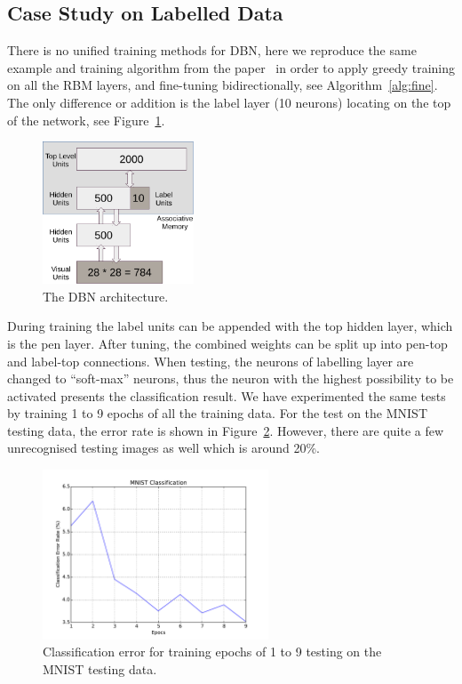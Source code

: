 	\subsection{Case Study on Labelled Data}
	There is no unified training methods for DBN, here we reproduce the same example and training algorithm from the paper~\cite{hinton2006fast} in order to apply greedy training on all the RBM layers, and fine-tuning bidirectionally, see Algorithm~\ref{alg:fine}.
	The only difference or addition is the label layer (10 neurons) locating on the top of the network, see Figure~\ref{Fig:case}.
		\begin{figure}[hbt]
				\centering
				\includegraphics[width=0.4\textwidth]{pics_sdbn/DBN.pdf}
				\caption{The DBN architecture.} 
				\label{Fig:case}
		\end{figure}
		
	During training the label units can be appended with the top hidden layer, which is the pen layer.
	After tuning, the combined weights can be split up into pen-top and label-top connections.
	When testing, the neurons of labelling layer are changed to ``soft-max'' neurons, thus the neuron with the highest possibility to be activated presents the classification result.
	We have experimented the same tests by training 1 to 9 epochs of all the training data.
	For the test on the MNIST testing data, the error rate is shown in Figure~\ref{Fig:class}.
	However, there are quite a few unrecognised testing images as well which is around 20\%.
		\begin{figure}[hbt]
				\centering
				\includegraphics[width=0.6\textwidth]{pics_sdbn/MNISTerror.pdf}
				\caption{Classification error for training epochs of 1 to 9 testing on the MNIST testing data.} 
				\label{Fig:class}
		\end{figure}	
	
